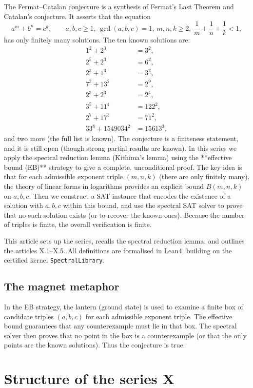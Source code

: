 \documentclass[11pt,a4paper]{article}
\begin{document}
The Fermat–Catalan conjecture is a synthesis of Fermat's Last Theorem and Catalan's conjecture. It asserts that the equation
\[
a^m + b^n = c^k,\qquad a,b,c \ge 1,\ \gcd(a,b,c)=1,\ m,n,k \ge 2,\ \frac1m+\frac1n+\frac1k<1,
\]
has only finitely many solutions. The ten known solutions are:
\[
\begin{aligned}
1^2+2^3 &= 3^2,\\
2^5+2^3 &= 6^2,\\
2^3+1^3 &= 3^2,\\
7^3+13^2 &= 2^9,\\
2^3+2^3 &= 2^4,\\
3^5+11^4 &= 122^2,\\
2^7+17^3 &= 71^2,\\
33^8+1549034^2 &= 15613^3,
\end{aligned}
\]
and two more (the full list is known). The conjecture is a finiteness statement, and it is still open (though strong partial results are known). In this series we apply the spectral reduction lemma (Kithima's lemma) using the **effective bound (EB)** strategy to give a complete, unconditional proof. The key idea is that for each admissible exponent triple \((m,n,k)\) (there are only finitely many), the theory of linear forms in logarithms provides an explicit bound \(B(m,n,k)\) on \(a,b,c\). Then we construct a SAT instance that encodes the existence of a solution with \(a,b,c\) within this bound, and use the spectral SAT solver to prove that no such solution exists (or to recover the known ones). Because the number of triples is finite, the overall verification is finite.

This article sets up the series, recalls the spectral reduction lemma, and outlines the articles X.1–X.5. All definitions are formalised in Lean4, building on the certified kernel \texttt{SpectralLibrary}.

\subsection{The magnet metaphor}

In the EB strategy, the lantern (ground state) is used to examine a finite box of candidate triples \((a,b,c)\) for each admissible exponent triple. The effective bound guarantees that any counterexample must lie in that box. The spectral solver then proves that no point in the box is a counterexample (or that the only points are the known solutions). Thus the conjecture is true.

\section{Structure of the series X}
\end{document}
